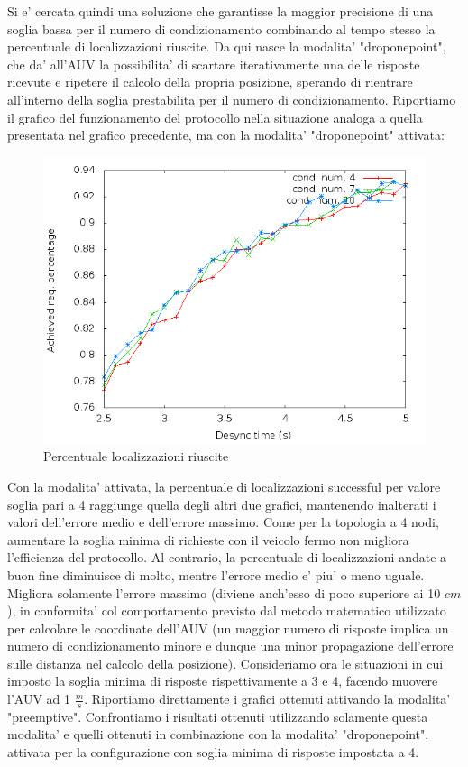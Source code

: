 Si e' cercata quindi una soluzione che garantisse la maggior precisione di una soglia bassa per il numero di condizionamento combinando al tempo stesso la percentuale di localizzazioni riuscite.
Da qui nasce la modalita' "droponepoint", che da' all'AUV la possibilita' di scartare iterativamente una delle risposte ricevute e ripetere il calcolo della propria posizione, sperando di rientrare all'interno della soglia prestabilita per il numero di condizionamento. Riportiamo il grafico del funzionamento del protocollo nella situazione analoga a quella presentata nel grafico precedente, ma con la modalita' "droponepoint" attivata:
\begin{figure}[H]
    \centering
    \includegraphics[scale=0.5]{hexagonsimulation/achievedlocreq3preempt0drop1speed0.png}
    \caption{Percentuale localizzazioni riuscite}
    \label{fig:hexagonsimulation/achievedlocreq3preempt0drop1speed0}
\end{figure}
Con la modalita' attivata, la percentuale di localizzazioni successful per valore soglia pari a 4 raggiunge quella degli altri due grafici, mantenendo inalterati i valori dell'errore medio e dell'errore massimo. 
Come per la topologia a 4 nodi, aumentare la soglia minima di richieste con il veicolo fermo non migliora l'efficienza del protocollo. Al contrario, la percentuale di localizzazioni andate a buon fine diminuisce di molto, mentre l'errore medio e' piu' o meno uguale. Migliora solamente l'errore massimo (diviene anch'esso di poco superiore ai 10 $cm$), in conformita' col comportamento previsto dal metodo matematico utilizzato per calcolare le coordinate dell'AUV (un maggior numero di risposte implica un numero di condizionamento minore e dunque una minor propagazione dell'errore sulle distanza nel calcolo della posizione).
Consideriamo ora le situazioni in cui imposto la soglia minima di risposte rispettivamente a 3 e 4, facendo muovere l'AUV ad 1 $\frac{m}{s}$.
Riportiamo direttamente i grafici ottenuti attivando la modalita' "preemptive". Confrontiamo i risultati ottenuti utilizzando solamente questa modalita' e quelli ottenuti in combinazione con la modalita' "droponepoint", attivata per la configurazione con soglia minima di risposte impostata a 4.



